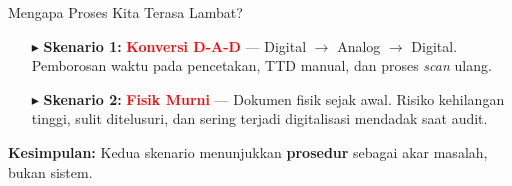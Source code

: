 \documentclass[aspectratio=169,11pt]{beamer}
\begin{document}
\begin{frame}{Mengapa Proses Kita Terasa Lambat?}
    \vspace{0.2cm}
    \begin{center}
    \begin{minipage}{0.94\textwidth}
    \begin{tcolorbox}[
        enhanced,
        colback=plnorange!5!white, colframe=plnorange,
        boxrule=0pt, leftrule=5pt, arc=4pt,
        left=8pt, right=8pt, top=6pt, bottom=6pt,
        drop fuzzy shadow southeast={black!15},
        title={\textbf{\scriptsize }},
        fonttitle=\bfseries,
        coltitle=plnorange!80!black,
        attach boxed title to top left={yshift=-3.5mm, xshift=2mm},
        boxed title style={colback=white, colframe=white, boxrule=0pt, left=2pt, right=2pt}
    ]
    \scriptsize
    \setlength{\itemsep}{1pt}
    \begin{enumerate}
        \item[\textcolor{plnorange}{$\blacktriangleright$}] \textbf{Skenario 1:} \textcolor{red}{\textbf{Konversi D-A-D}} — Digital $\rightarrow$ Analog $\rightarrow$ Digital. Pemborosan waktu pada pencetakan, TTD manual, dan proses \textit{scan} ulang.
        \item[\textcolor{plnorange}{$\blacktriangleright$}] \textbf{Skenario 2:} \textcolor{red}{\textbf{Fisik Murni}} — Dokumen fisik sejak awal. Risiko kehilangan tinggi, sulit ditelusuri, dan sering terjadi digitalisasi mendadak saat audit.
    \end{enumerate}
    \vspace{0.1cm}
    {\scriptsize\textbf{Kesimpulan:} Kedua skenario menunjukkan \textbf{\color{plnblue}prosedur} sebagai akar masalah, bukan sistem.}
    \end{tcolorbox}
    \end{minipage}
    \end{center}
\end{frame}
\end{document}
